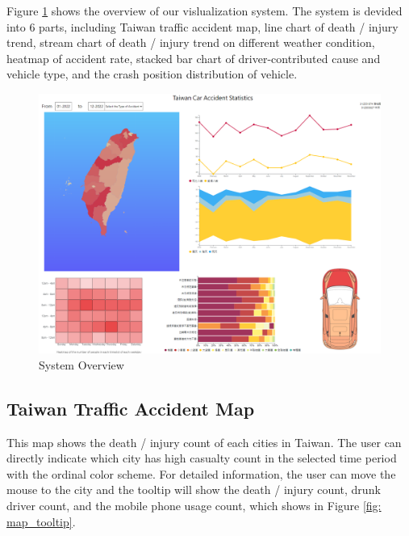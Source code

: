 \documentclass[a4paper, oneside, final, 12pt]{scrartcl} %
\begin{document}
Figure \ref{fig: system_overview} shows the overview of our vislualization system.
The system is devided into 6 parts,
including Taiwan traffic accident map, line chart of death / injury trend, 
stream chart of death / injury trend on different weather condition,
heatmap of accident rate, stacked bar chart of driver-contributed cause and vehicle type,
and the crash position distribution of vehicle.

\begin{figure}[htbp]
  \centering
  \includegraphics[width=1\textwidth]{"./Image/system_overview.png"}
  \caption{System Overview}
  \label{fig: system_overview}
\end{figure}

\subsection{Taiwan Traffic Accident Map}

This map shows the death / injury count of each cities in Taiwan.
The user can directly indicate which city has high casualty count
in the selected time period with the ordinal color scheme.
For detailed information, the user can move the mouse to the city
and the tooltip will show the death / injury count,
drunk driver count, and the mobile phone usage count,
which shows in Figure \ref{fig: map_tooltip}.
\end{document}

